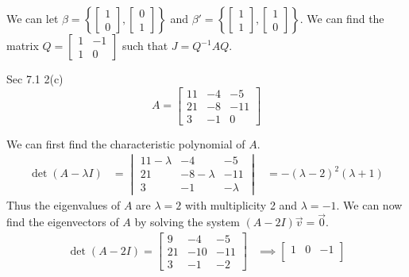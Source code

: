 \documentclass[answers,12pt,addpoints]{exam}
\begin{document}
\begin{questions}
\begin{solution}
        We can let $\beta = \left\{ \begin{bmatrix} 1\\ 0 \end{bmatrix}, \begin{bmatrix} 0 \\ 1 \end{bmatrix} \right\}$ and $\beta' = \left\{ \begin{bmatrix} 1\\ 1 \end{bmatrix}, \begin{bmatrix} 1 \\ 0 \end{bmatrix} \right\}$. We can find the matrix $Q = \begin{bmatrix}
            1 & -1 \\
            1 & 0
        \end{bmatrix}$
        such that $J = Q^{-1}AQ$.
    \end{solution}
    \question Sec 7.1 2(c)
    $$A = \begin{bmatrix}
        11 & -4 & -5\\
        21 & -8 & -11\\
        3 & -1 & 0
    \end{bmatrix}$$
    \begin{solution}
        We can first find the characteristic polynomial of $A$.
        \begin{align*}
            \det(A - \lambda I) &= \begin{vmatrix}
                11 - \lambda & -4 & -5 \\
                21 & -8 - \lambda & -11 \\
                3 & -1 & -\lambda
            \end{vmatrix}
            &= -(\lambda-2)^2(\lambda+1)
        \end{align*}
        Thus the eigenvalues of $A$ are $\lambda = 2$ with multiplicity 2 and $\lambda = -1$. We can now find the eigenvectors of $A$ by solving the system $(A - 2I)\vec{v} = \vec{0}$.
        \begin{align*} \det(A - 2I) = \begin{bmatrix}
            9 & -4 & -5 \\
            21 & -10 & -11 \\
            3 & -1 & -2
        \end{bmatrix} 
        &\implies \begin{bmatrix}
            1 & 0 & -1 \\

\end{bmatrix}
\end{align*}
\end{solution}
\end{questions}
\end{document}
